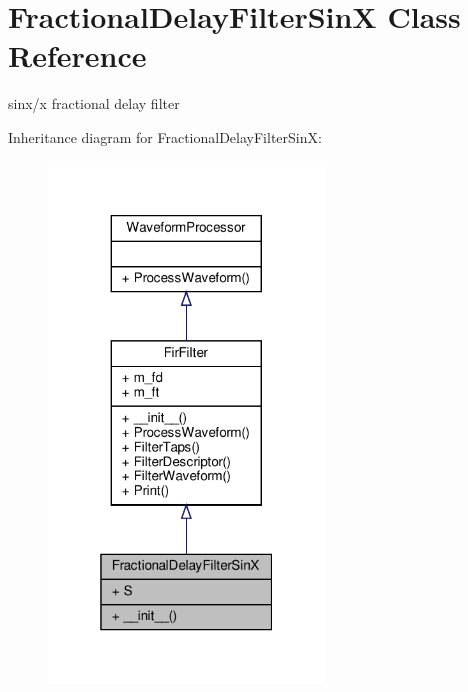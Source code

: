 \hypertarget{classSignalIntegrity_1_1TimeDomain_1_1Filters_1_1InterpolatorSinX_1_1FractionalDelayFilterSinX}{}\section{Fractional\+Delay\+Filter\+SinX Class Reference}
\label{classSignalIntegrity_1_1TimeDomain_1_1Filters_1_1InterpolatorSinX_1_1FractionalDelayFilterSinX}


sinx/x fractional delay filter  




Inheritance diagram for Fractional\+Delay\+Filter\+SinX\+:\nopagebreak
\begin{figure}[H]
\begin{center}
\leavevmode
\includegraphics[width=208pt]{classSignalIntegrity_1_1TimeDomain_1_1Filters_1_1InterpolatorSinX_1_1FractionalDelayFilterSinX__inherit__graph}
\end{center}
\end{figure}


